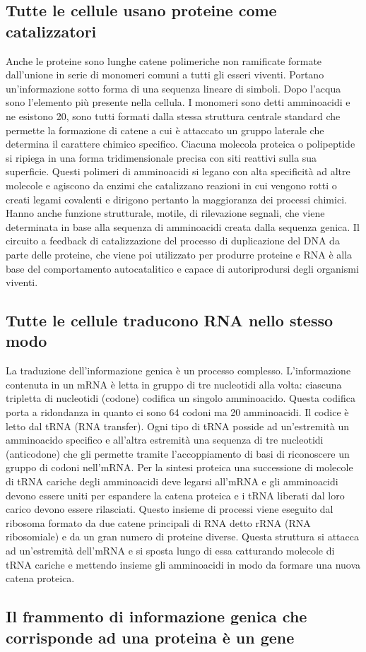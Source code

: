 \subsection{Tutte le cellule usano proteine come catalizzatori}
Anche le proteine sono lunghe catene polimeriche non ramificate formate dall'unione in serie di monomeri comuni a tutti gli esseri viventi. Portano 
un'informazione sotto forma di una sequenza lineare di simboli. Dopo l'acqua sono l'elemento pi\`u presente nella cellula. I monomeri sono detti amminoacidi
e ne esistono 20, sono tutti formati dalla stessa struttura centrale standard che permette la formazione di catene a cui \`e attaccato un gruppo laterale 
che determina il carattere chimico specifico. Ciacuna molecola proteica o polipeptide si ripiega in una forma tridimensionale precisa con siti reattivi 
sulla sua superficie. Questi polimeri di amminoacidi si legano con alta specificit\`a ad altre molecole e agiscono da enzimi che catalizzano reazioni in cui
vengono rotti o creati legami covalenti e dirigono pertanto la maggioranza dei processi chimici. Hanno anche funzione strutturale, motile, di rilevazione
segnali, che viene determinata in base alla sequenza di amminoacidi creata dalla sequenza genica. Il circuito a feedback di catalizzazione del processo di
duplicazione del DNA da parte delle proteine, che viene poi utilizzato per produrre proteine e RNA \`e alla base del comportamento autocatalitico e capace 
di autoriprodursi degli organismi viventi. 
\subsection{Tutte le cellule traducono RNA nello stesso modo}
La traduzione dell'informazione genica \`e un processo complesso. L'informazione contenuta in un mRNA \`e letta in gruppo di tre nucleotidi alla volta: 
ciascuna tripletta di nucleotidi (codone) codifica un singolo amminoacido. Questa codifica porta a ridondanza in quanto ci sono 64 codoni ma 20 amminoacidi.
Il codice \`e letto dal tRNA (RNA transfer). Ogni tipo di tRNA posside ad un'estremit\`a un amminoacido specifico e all'altra estremit\`a una sequenza di
tre nucleotidi (anticodone) che gli permette tramite l'accoppiamento di basi di riconoscere un gruppo di codoni nell'mRNA. Per la sintesi proteica una 
successione di molecole di tRNA cariche degli amminoacidi deve legarsi all'mRNA e gli amminoacidi devono essere uniti per espandere la catena proteica e i 
tRNA liberati dal loro carico devono essere rilasciati. Questo insieme di processi viene eseguito dal ribosoma formato da due catene principali di RNA
detto rRNA (RNA ribosomiale) e da un gran numero di proteine diverse. Questa struttura si attacca ad un'estremit\`a dell'mRNA e si sposta lungo di essa
catturando molecole di tRNA cariche e mettendo insieme gli amminoacidi in modo da formare una nuova catena proteica. 
\subsection{Il frammento di informazione genica che corrisponde ad una proteina \`e un gene}

